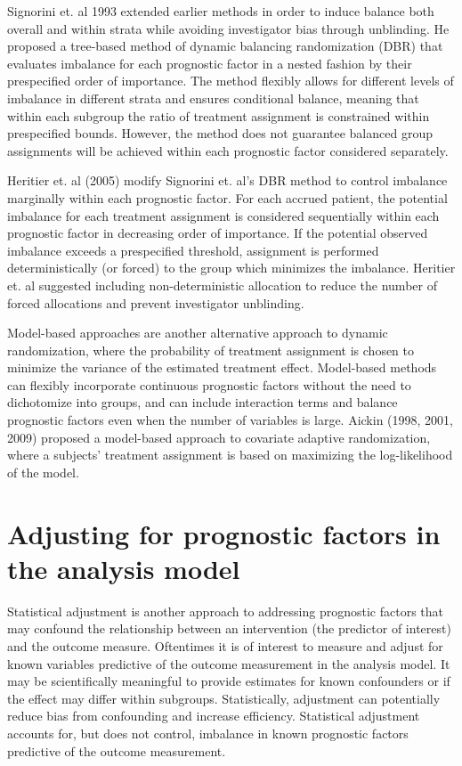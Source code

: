Signorini et. al 1993 extended earlier methods in order to induce balance both overall and within strata while avoiding investigator bias through unblinding.  
He proposed a tree-based method of dynamic balancing randomization (DBR) that evaluates imbalance for each prognostic factor in a nested fashion by their prespecified order of importance.  
The method flexibly allows for different levels of imbalance in different strata and ensures conditional balance, meaning that within each subgroup the ratio of treatment assignment is constrained within prespecified bounds.  
However, the method does not guarantee balanced group assignments will be achieved within each prognostic factor considered separately. 

Heritier et. al (2005) modify Signorini et. al’s DBR method to control imbalance marginally within each prognostic factor.  
For each accrued patient, the potential imbalance for each treatment assignment is considered sequentially within each prognostic factor in decreasing order of importance.  
If the potential observed imbalance exceeds a prespecified threshold, assignment is performed deterministically (or forced) to the group which minimizes the imbalance.  
Heritier et. al suggested including non-deterministic allocation to reduce the number of forced allocations and prevent investigator unblinding.

Model-based approaches are another alternative approach to dynamic randomization, where the probability of treatment assignment is chosen to minimize the variance of the estimated treatment effect. 
Model-based methods can flexibly incorporate continuous prognostic factors without the need to dichotomize into groups, and can include interaction terms and balance prognostic factors even when the number of variables is large.  
Aickin (1998, 2001, 2009) proposed a model-based approach to covariate adaptive randomization, where a subjects’ treatment assignment is based on maximizing the log-likelihood of the model. 

\section{Adjusting for prognostic factors in the analysis model}
Statistical adjustment is another approach to addressing prognostic factors that may confound the relationship between an intervention (the predictor of interest) and the outcome measure.
Oftentimes it is of interest to measure and adjust for known variables predictive of the outcome measurement in the analysis model. 
It may be scientifically meaningful to provide estimates for known confounders or if the effect may differ within subgroups. 
Statistically, adjustment can potentially reduce bias from confounding and increase efficiency.
Statistical adjustment accounts for, but does not control, imbalance in known prognostic factors predictive of the outcome measurement. 

